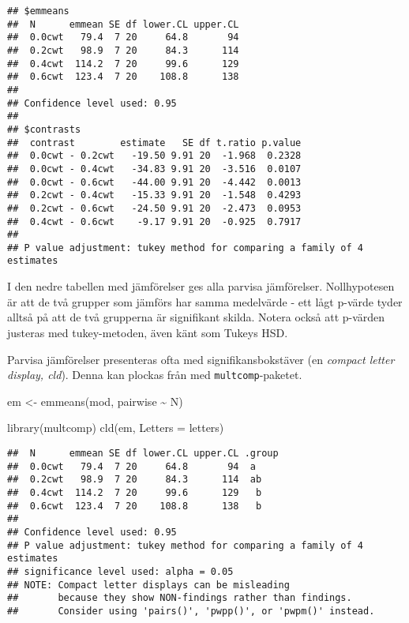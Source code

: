 \documentclass[
]{book}
\newenvironment{Shaded}{\begin{snugshade}}{\end{snugshade}}
\newcommand{\AttributeTok}[1]{\textcolor[rgb]{0.77,0.63,0.00}{#1}}
\newcommand{\FunctionTok}[1]{\textcolor[rgb]{0.00,0.00,0.00}{#1}}
\newcommand{\NormalTok}[1]{#1}
\newcommand{\OtherTok}[1]{\textcolor[rgb]{0.56,0.35,0.01}{#1}}
\newcommand{\SpecialCharTok}[1]{\textcolor[rgb]{0.00,0.00,0.00}{#1}}
\theoremstyle{definition}
\theoremstyle{definition}
\theoremstyle{definition}
\theoremstyle{definition}
\theoremstyle{remark}
\begin{document}
\begin{verbatim}
## $emmeans
##  N      emmean SE df lower.CL upper.CL
##  0.0cwt   79.4  7 20     64.8       94
##  0.2cwt   98.9  7 20     84.3      114
##  0.4cwt  114.2  7 20     99.6      129
##  0.6cwt  123.4  7 20    108.8      138
## 
## Confidence level used: 0.95 
## 
## $contrasts
##  contrast        estimate   SE df t.ratio p.value
##  0.0cwt - 0.2cwt   -19.50 9.91 20  -1.968  0.2328
##  0.0cwt - 0.4cwt   -34.83 9.91 20  -3.516  0.0107
##  0.0cwt - 0.6cwt   -44.00 9.91 20  -4.442  0.0013
##  0.2cwt - 0.4cwt   -15.33 9.91 20  -1.548  0.4293
##  0.2cwt - 0.6cwt   -24.50 9.91 20  -2.473  0.0953
##  0.4cwt - 0.6cwt    -9.17 9.91 20  -0.925  0.7917
## 
## P value adjustment: tukey method for comparing a family of 4 estimates
\end{verbatim}

I den nedre tabellen med jämförelser ges alla parvisa jämförelser. Nollhypotesen är att de två grupper som jämförs har samma medelvärde - ett lågt p-värde tyder alltså på att de två grupperna är signifikant skilda. Notera också att p-värden justeras med tukey-metoden, även känt som Tukeys HSD.

Parvisa jämförelser presenteras ofta med signifikansbokstäver (en \emph{compact letter display, cld}). Denna kan plockas från med \texttt{multcomp}-paketet.

\begin{Shaded}
\begin{Highlighting}[]
\NormalTok{em }\OtherTok{\textless{}{-}} \FunctionTok{emmeans}\NormalTok{(mod, pairwise }\SpecialCharTok{\textasciitilde{}}\NormalTok{ N)}

\FunctionTok{library}\NormalTok{(multcomp)}
\FunctionTok{cld}\NormalTok{(em, }\AttributeTok{Letters =}\NormalTok{ letters)}
\end{Highlighting}
\end{Shaded}

\begin{verbatim}
##  N      emmean SE df lower.CL upper.CL .group
##  0.0cwt   79.4  7 20     64.8       94  a    
##  0.2cwt   98.9  7 20     84.3      114  ab   
##  0.4cwt  114.2  7 20     99.6      129   b   
##  0.6cwt  123.4  7 20    108.8      138   b   
## 
## Confidence level used: 0.95 
## P value adjustment: tukey method for comparing a family of 4 estimates 
## significance level used: alpha = 0.05 
## NOTE: Compact letter displays can be misleading
##       because they show NON-findings rather than findings.
##       Consider using 'pairs()', 'pwpp()', or 'pwpm()' instead.
\end{verbatim}
\end{document}
